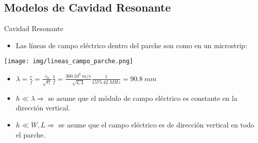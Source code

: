 \subsection{Modelos de Cavidad Resonante}
\begin{frame}{Cavidad Resonante}

\begin{itemize}
    \item<1-> Las líneas de campo eléctrico dentro del parche son como en un microstrip:
\end{itemize}

\begin{center}
    \texttt{[image: img/lineas\_campo\_parche.png]}
\end{center}

\begin{itemize}
    \item<3-> $\lambda = \frac{c}{f} = \frac{c_0}{\sqrt{\epsilon_r}} \frac{1}{f} = \frac{300 \ 10^6 \ m/s}{\sqrt{4,4}} \frac{1}{1575.42 \ MHz} = 90.8 \ mm$
    \item<4-> $h \ll \lambda \Rightarrow$ se asume que el módulo de campo eléctrico es constante en la dirección vertical.
    \item<5-> $h \ll W, L \Rightarrow$ se asume que el campo eléctrico es de dirección vertical en todo el parche.
\end{itemize}
    
\end{frame}



